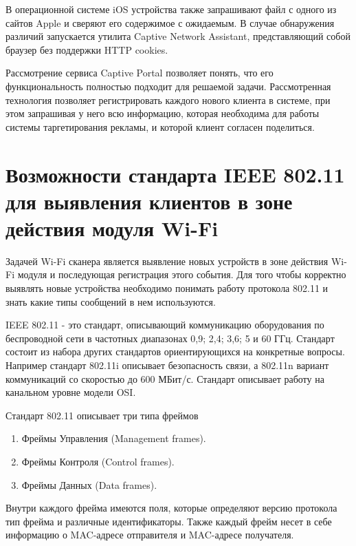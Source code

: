 В операционной системе iOS устройства также запрашивают файл с одного из сайтов Apple и сверяют его содержимое с ожидаемым. В случае обнаружения различий запускается утилита Captive Network Assistant, представляющий собой браузер без поддержки HTTP cookies.

Рассмотрение сервиса Captive Portal позволяет понять, что его функциональность полностью подходит для решаемой задачи. Рассмотренная технология позволяет регистрировать каждого нового клиента в системе, при этом запрашивая у него всю информацию, которая необходима для работы системы таргетирования рекламы, и которой клиент согласен поделиться.


\section{Возможности стандарта IEEE 802.11 для выявления клиентов в зоне действия модуля Wi-Fi}

Задачей Wi-Fi сканера является выявление новых устройств в зоне действия Wi-Fi модуля и последующая регистрация этого события. Для того чтобы корректно выявлять новые устройства необходимо понимать работу протокола 802.11 и знать какие типы сообщений в нем используются.

IEEE 802.11 - это стандарт, описывающий коммуникацию оборудования по беспроводной сети в частотных диапазонах 0,9; 2,4; 3,6; 5 и 60 ГГц\cite{iee802_11}. Стандарт состоит из набора других стандартов ориентирующихся на конкретные вопросы. Например стандарт 802.11i описывает безопасность связи, а 802.11n вариант коммуникаций со скоростью до 600 МБит/с. Стандарт описывает работу на канальном уровне модели OSI.

Стандарт 802.11 описывает три типа фреймов

\begin{enumerate}
	\item Фреймы Управления (Management frames).
	\item Фреймы Контроля (Control frames).
	\item Фреймы Данных (Data frames).
\end{enumerate}

Внутри каждого фрейма имеются поля, которые определяют версию протокола тип фрейма и различные идентификаторы. Также каждый фрейм несет в себе информацию о MAC-адресе отправителя и MAC-адресе получателя.

